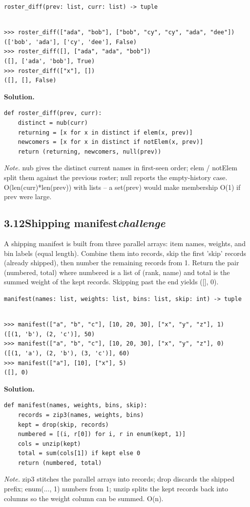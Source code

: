 \documentclass[10pt,letterpaper]{book}
\begin{document}
\noindent\texttt{roster\_diff(prev: list, curr: list) -> tuple}
\begin{lstlisting}[style=ex]

>>> roster_diff(["ada", "bob"], ["bob", "cy", "cy", "ada", "dee"])
(['bob', 'ada'], ['cy', 'dee'], False)
>>> roster_diff([], ["ada", "ada", "bob"])
([], ['ada', 'bob'], True)
>>> roster_diff(["x"], [])
([], [], False)

\end{lstlisting}
\noindent\textbf{Solution.}
\begin{lstlisting}[style=code]
def roster_diff(prev, curr):
    distinct = nub(curr)
    returning = [x for x in distinct if elem(x, prev)]
    newcomers = [x for x in distinct if notElem(x, prev)]
    return (returning, newcomers, null(prev))
\end{lstlisting}
\noindent\textit{Note.} nub gives the distinct current names in first-seen order; elem / notElem split them against the previous roster; null reports the empty-history case. O(len(curr)*len(prev)) with lists -- a set(prev) would make membership O(1) if prev were large.

\subsection*{3.12\quad Shipping manifest\hfill\textnormal{\textit{challenge}}}
A shipping manifest is built from three parallel arrays: item names, weights, and bin labels (equal length). Combine them into records, skip the first 'skip' records (already shipped), then number the remaining records from 1. Return the pair (numbered, total) where numbered is a list of (rank, name) and total is the summed weight of the kept records. Skipping past the end yields ([], 0).

\noindent\texttt{manifest(names: list, weights: list, bins: list, skip: int) -> tuple}
\begin{lstlisting}[style=ex]

>>> manifest(["a", "b", "c"], [10, 20, 30], ["x", "y", "z"], 1)
([(1, 'b'), (2, 'c')], 50)
>>> manifest(["a", "b", "c"], [10, 20, 30], ["x", "y", "z"], 0)
([(1, 'a'), (2, 'b'), (3, 'c')], 60)
>>> manifest(["a"], [10], ["x"], 5)
([], 0)

\end{lstlisting}
\noindent\textbf{Solution.}
\begin{lstlisting}[style=code]
def manifest(names, weights, bins, skip):
    records = zip3(names, weights, bins)
    kept = drop(skip, records)
    numbered = [(i, r[0]) for i, r in enum(kept, 1)]
    cols = unzip(kept)
    total = sum(cols[1]) if kept else 0
    return (numbered, total)
\end{lstlisting}
\noindent\textit{Note.} zip3 stitches the parallel arrays into records; drop discards the shipped prefix; enum(..., 1) numbers from 1; unzip splits the kept records back into columns so the weight column can be summed. O(n).
\end{document}
